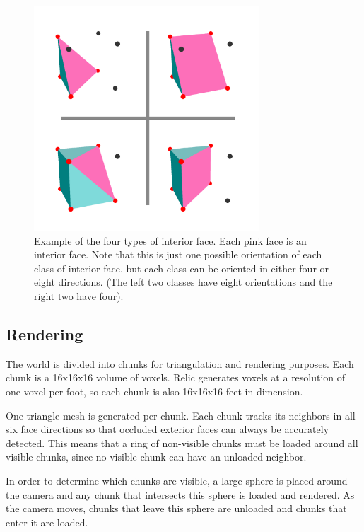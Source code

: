 \begin{figure}
	\centering
		\includegraphics[width=0.75\textwidth]{figures/interiorfaces2.png}
	\caption{
		Example of the four types of interior face.
		Each pink face is an interior face.
		Note that this is just one possible orientation of each class of interior face, but each class can be oriented in either four or eight directions.
		(The left two classes have eight orientations and the right two have four).
	}
	\label{fig:interiorfaces2}
\end{figure}

\subsection{Rendering}

The world is divided into chunks for triangulation and rendering purposes.
Each chunk is a 16x16x16 volume of voxels.
Relic generates voxels at a resolution of one voxel per foot, so each chunk is also 16x16x16 feet in dimension.

One triangle mesh is generated per chunk.
Each chunk tracks its neighbors in all six face directions so that occluded exterior faces can always be accurately detected.
This means that a ring of non-visible chunks must be loaded around all visible chunks, since no visible chunk can have an unloaded neighbor.

In order to determine which chunks are visible, a large sphere is placed around the camera and any chunk that intersects this sphere is loaded and rendered.
As the camera moves, chunks that leave this sphere are unloaded and chunks that enter it are loaded.

